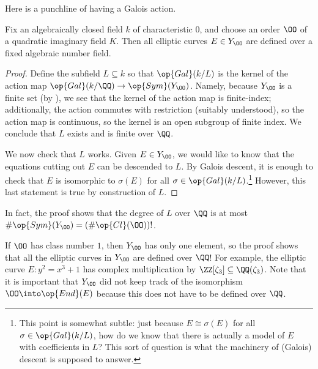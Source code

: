 \documentclass[../notes.tex]{subfiles}
\begin{document}
Here is a punchline of having a Galois action.
\begin{proposition} \label{prop:cm-defined-over-number-field}
	Fix an algebraically closed field $k$ of characteristic $0$, and choose an order $\OO$ of a quad\-ratic imaginary field $K$. Then all elliptic curves $E\in Y_\OO$ are defined over a fixed algebraic number field.
\end{proposition}
\begin{proof}
	Define the subfield $L\subseteq k$ so that $\op{Gal}(k/L)$ is the kernel of the action map $\op{Gal}(k/\QQ)\to\op{Sym}(Y_\OO)$. Namely, because $Y_\OO$ is a finite set (by ), we see that the kernel of the action map is finite-index; additionally, the action commutes with restriction (suitably understood), so the action map is continuous, so the kernel is an open subgroup of finite index. We conclude that $L$ exists and is finite over $\QQ$.

	We now check that $L$ works. Given $E\in Y_\OO$, we would like to know that the equations cutting out $E$ can be descended to $L$. By Galois descent, it is enough to check that $E$ is isomorphic to $\sigma(E)$ for all $\sigma\in\op{Gal}(k/L)$.\footnote{This point is somewhat subtle: just because $E\cong\sigma(E)$ for all $\sigma\in\op{Gal}(k/L)$, how do we know that there is actually a model of $E$ with coefficients in $L$? This sort of question is what the machinery of (Galois) descent is supposed to answer.} However, this last statement is true by construction of $L$.
\end{proof}
\begin{remark} \label{rem:cm-defined-over-bounded-field}
	In fact, the proof shows that the degree of $L$ over $\QQ$ is at most $\#\op{Sym}(Y_\OO)=(\#\op{Cl}(\OO))!$.
\end{remark}
\begin{example} \label{ex:cm-defined-over-q}
	If $\OO$ has class number $1$, then $Y_\OO$ has only one element, so the proof shows that all the elliptic curves in $Y_\OO$ are defined over $\QQ$! For example, the elliptic curve $E\colon y^2=x^3+1$ has complex multiplication by $\ZZ[\zeta_3]\subseteq\QQ(\zeta_3)$. Note that it is important that $Y_\OO$ did not keep track of the isomorphism $\OO\into\op{End}(E)$ because this does not have to be defined over $\QQ$.
\end{example}
\end{document}
